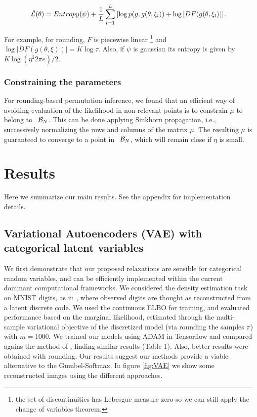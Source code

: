 \documentclass{article}
\begin{document}
$$\hat{\mathcal{L}}(\theta) = Entropy(\psi) +  \frac{1}{L}\sum_{l=1}^L \left[ \log p(y,  g(\theta, \xi_l) ) +  \log |DF(g(\theta, \xi_l)|\right].$$

For example, for rounding, $F$ is piecewise linear \footnote{the set of discontinuities has Lebesgue measure zero so we can still apply the change of variables theorem.} and $\log | DF(g(\theta, \xi)) |= K\log \tau$. Also, if $\psi$ is gaussian its entropy is given by $K\log(\eta^2 2\pi e  )/2$.


\subsubsection{Constraining the parameters}
For rounding-based permutation inference, we found that an efficient way of avoiding evaluation of the likelihood in non-relevant points is to constrain $\mu$ to belong to ~$\mathcal{B}_N$. This can be done applying Sinkhorn propagation, i.e., successively normalizing the rows and columns of the matrix $\mu$. The resulting $\mu$ is guaranteed to converge to a point in ~$\mathcal{B}_N$, which will remain close if $\eta$ is small.
\section{Results}
Here we summarize our main results. See the appendix for implementation details.
\subsection{Variational Autoencoders (VAE) with categorical latent variables}
We first demonstrate that our proposed relaxations are sensible for categorical random variables, and can be efficiently implemented within the current dominant computational frameworks. We considered the density estimation task on MNIST digits, as in \cite{maddison2016concrete, jang2016categorical}, where observed digits are thought as reconstructed from a latent discrete code. We used the continuous ELBO for training, and evaluated performance based on the marginal likelihood, estimated through the multi-sample variational objective of the discretized model (via rounding the samples $\pi$) with $m=1000$. We trained our models using ADAM in Tensorflow and compared agains the method of \cite{jang2016categorical}, finding similar results (Table 1). Also, better results were obtained with rounding. Our results suggest our methods provide a viable alternative to the Gumbel-Softmax. In figure \ref{fig:VAE} we show some reconstructed images using the different approaches.
\end{document}
